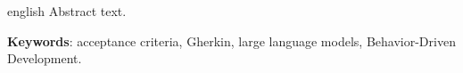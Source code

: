 \begin{resumo}[Abstract]
 \begin{otherlanguage*}{english}
  Abstract text.

   \vspace{\onelineskip}

   \noindent
   \textbf{Keywords}: acceptance criteria, Gherkin, large language models, Behavior-Driven Development.
 \end{otherlanguage*}
\end{resumo}
